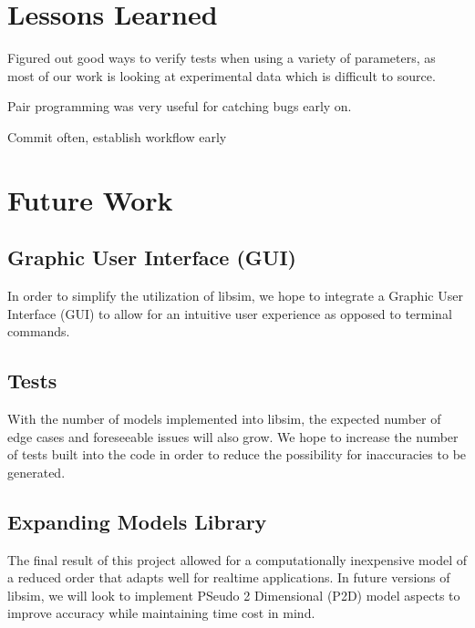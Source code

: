 \documentclass[letterpaper,10pt,english]{sphinxmanual}
\begin{document}
\chapter{Lessons Learned}
\label{\detokenize{lessons_learned:lessons-learned}}\label{\detokenize{lessons_learned::doc}}
\sphinxAtStartPar
Figured out good ways to verify tests when using a variety of parameters,
as most of our work is looking at experimental data which is difficult
to source.

\sphinxAtStartPar
Pair programming was very useful for catching bugs early on.

\sphinxAtStartPar
Commit often, establish workflow early


\chapter{Future Work}
\label{\detokenize{future:future-work}}\label{\detokenize{future::doc}}

\section{Graphic User Interface (GUI)}
\label{\detokenize{future:graphic-user-interface-gui}}
\sphinxAtStartPar
In order to simplify the utilization of libsim, we hope to integrate
a Graphic User Interface (GUI) to allow for an intuitive user
experience as opposed to terminal commands.


\section{Tests}
\label{\detokenize{future:tests}}
\sphinxAtStartPar
With the number of models implemented into libsim, the expected number
of edge cases and foreseeable issues will also grow. We hope to increase
the number of tests built into the code in order to reduce the possibility
for inaccuracies to be generated.


\section{Expanding Models Library}
\label{\detokenize{future:expanding-models-library}}
\sphinxAtStartPar
The final result of this project allowed for a computationally inexpensive
model of a reduced order that adapts well for real\sphinxhyphen{}time applications. In
future versions of libsim, we will look to implement PSeudo 2 Dimensional
(P2D) model aspects to improve accuracy while maintaining time cost in mind.
\end{document}
